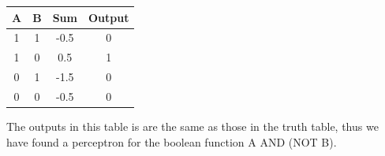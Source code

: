 \documentclass{article}
\begin{document}
\begin{table}[h!]
\centering
\begin{tabular}{c c c c}
 A & B & Sum & Output\\
\hline
1&1&-0.5&0\\
1&0&0.5&1\\
0&1&-1.5&0\\
0&0&-0.5&0
\end{tabular}
\end{table}

The outputs in this table is are the same as those in the truth table, thus we have found a perceptron for the boolean function A AND (NOT B). 
\end{document}
